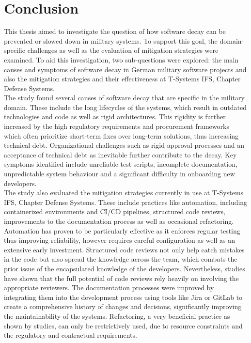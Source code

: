 \section{Conclusion}
This thesis aimed to investigate the question of how software decay can be prevented or slowed down in military systems. To support this goal, the domain-specific challenges as well as the evaluation of mitigation strategies were examined.
To aid this investigation, two sub-questions were explored: the main causes and symptoms of software decay in German military software projects and also the mitigation strategies and their effectiveness at T-Systems IFS, Chapter Defense Systems.\\

The study found several causes of software decay that are specific in the military domain. These include the long lifecycles of the systems, which result in outdated technologies and code as well as rigid architectures. This rigidity is further
increased by the high regulatory requirements and procurement frameworks which often prioritize short-term fixes over long-term solutions, thus increasing technical debt. Organizational challenges such as rigid approval processes
and an acceptance of technical debt as inevitable further contribute to the decay. Key symptoms identified include unreliable test scripts, incomplete documentation, unpredictable system behaviour and a significant difficulty in onboarding new developers.\\

The study also evaluated the mitigation strategies currently in use at T-Systems IFS, Chapter Defense Systems. These include practices like automation, including containerized environments and CI/CD pipelines,
structured code reviews, improvements to the documentation process as well as occasional refactoring. Automation has proven to be particularly effective as it enforces regular testing thus improving reliability, however requires careful configuration as well as an extensive early investment.
Structured code reviews not only help catch mistakes in the code but also spread the knowledge across the team, which combats the prior issue of the encapsulated knowledge of the developers. Nevertheless, studies have shown that the full potential of code reviews rely heavily on involving the appropriate reviewers.
The documentation processes were improved by integrating them into the development process using tools like Jira or GitLab to create a comprehensive history of changes and decisions, significantly improving the maintainability of the systems.
Refactoring, a very beneficial practice as shown by studies, can only be restrictively used, due to resource constraints and the regulatory and contractual requirements.\\

